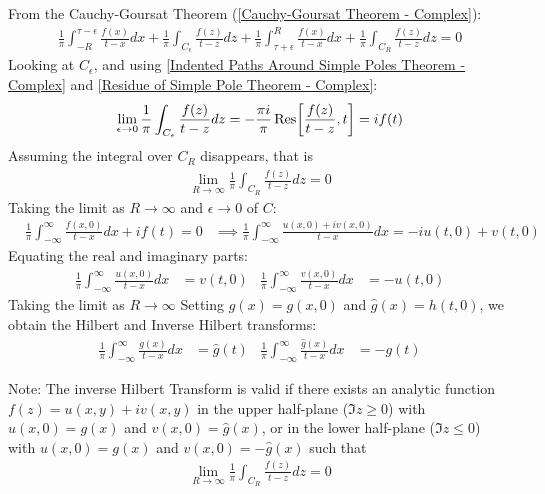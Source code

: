 \documentclass[12pt, english]{book}
\makeatletter
\renewenvironment{proof}[1][\proofname]{\par
	\pushQED{\qed}%
	\normalfont \topsep6\p@\@plus6\p@\relax
	\list{}{%
		\settowidth{\leftmargin}{\itshape\proofname:\hskip\labelsep}%
		\setlength{\labelwidth}{0pt}%
		\setlength{\itemindent}{-\leftmargin}%
	}%
	\item[\hskip\labelsep\itshape#1\@addpunct{:}]\ignorespaces
	}{ \popQED\endlist\@endpefalse}
\makeatother
\begin{document}
\begin{proof}
		From the Cauchy-Goursat Theorem (\cref{Cauchy-Goursat Theorem - Complex}):
		\begin{align*}
			\frac{1}{\pi} \int_{-R}^{\tau-\epsilon} \frac{f(x)}{t-x} dx
				+ \frac{1}{\pi} \int_{C_\epsilon} \frac{f(z)}{t - z} dz 
				+ \frac{1}{\pi} \int_{\tau+\epsilon}^{R} \frac{f(x)}{t - x} dx
				+ \frac{1}{\pi} \int_{C_R} \frac{f(z)}{t - z} dz = 0
		\end{align*}
		Looking at \(C_\epsilon\), and using \cref{Indented Paths Around Simple Poles Theorem - Complex} and \cref{Residue of Simple Pole Theorem - Complex}:
		\begin{align*}
			\lim_{\epsilon \rightarrow 0} \frac{1}{\pi} 
			\int_{C_\epsilon} \frac{f(z)}{t - z} dz 
			= - \frac{\pi i}{\pi} \Res[\frac{f(z)}{t - z}, t] = i f(t)
		\end{align*}
		Assuming the integral over \(C_R\) disappears, that is
		\begin{align*}
			\lim_{R\rightarrow \infty} \frac{1}{\pi} \int_{C_R} \frac{f(z)}{t - z} dz = 0
		\end{align*}
		Taking the limit as \(R \rightarrow \infty\) and \(\epsilon \rightarrow 0\) of \(C\):
		\begin{align*}
			&\frac{1}{\pi} \int_{-\infty}^{\infty} \frac{f(x, 0)}{t - x} dx + if(t) = 0
			&\implies \frac{1}{\pi} \int_{-\infty}^{\infty} \frac{u(x,0) + iv(x,0)}{t-x} dx
				= -iu(t, 0) + v(t, 0)
		\end{align*}
		Equating the real and imaginary parts:
		\begin{align*}
			\frac{1}{\pi} \int_{-\infty}^{\infty} \frac{u(x,0)}{t-x} dx &= v(t, 0)	&
			\frac{1}{\pi} \int_{-\infty}^{\infty} \frac{v(x,0)}{t-x} dx &= -u(t, 0)
		\end{align*}
		Taking the limit as \(R \rightarrow \infty\)
		Setting \(g(x) = g(x, 0)\) and \(\hat{g}(x) = h(t, 0)\), we obtain the Hilbert and Inverse Hilbert transforms:
		\begin{align*}
			\frac{1}{\pi} \int_{-\infty}^{\infty} \frac{g(x)}{t-x} dx &= \hat{g}(t)	&
			\frac{1}{\pi} \int_{-\infty}^{\infty} \frac{\hat{g}(x)}{t-x} dx &= -g(t)
		\end{align*}
	\end{proof}

	Note: The inverse Hilbert Transform is valid if there exists an analytic function \(f(z) = u(x,y) + iv(x,y)\) in the upper half-plane (\(\Im{z} \geq 0\)) with \(u(x, 0) = g(x)\) and \(v(x,0) = \hat{g}(x)\), or in the lower half-plane (\(\Im{z} \leq 0\)) with \(u(x,0) = g(x)\) and \(v(x,0) = -\hat{g}(x)\) such that 
	\begin{align*}
	 	\lim_{R \rightarrow \infty} \frac{1}{\pi} \int_{C_R} \frac{f(z)}{t - z} dz = 0
	\end{align*}
\end{document}
